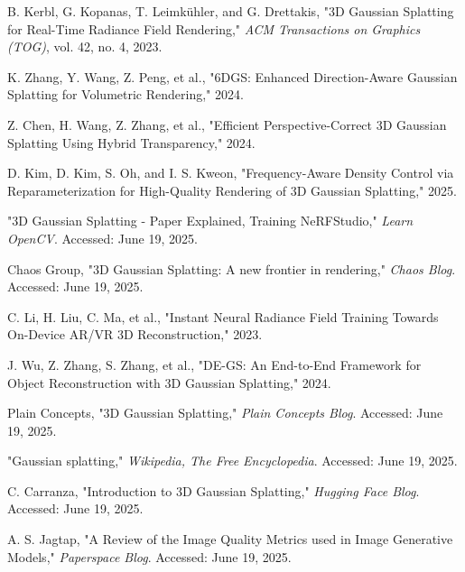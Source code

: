 \documentclass[11pt]{article}
\begin{document}
\begin{thebibliography}{99}
B. Kerbl, G. Kopanas, T. Leimkühler, and G. Drettakis, "3D Gaussian Splatting for Real-Time Radiance Field Rendering," \textit{ACM Transactions on Graphics (TOG)}, vol. 42, no. 4, 2023.

K. Zhang, Y. Wang, Z. Peng, et al., "6DGS: Enhanced Direction-Aware Gaussian Splatting for Volumetric Rendering," 2024.

Z. Chen, H. Wang, Z. Zhang, et al., "Efficient Perspective-Correct 3D Gaussian Splatting Using Hybrid Transparency," 2024.

D. Kim, D. Kim, S. Oh, and I. S. Kweon, "Frequency-Aware Density Control via Reparameterization for High-Quality Rendering of 3D Gaussian Splatting," 2025.

"3D Gaussian Splatting - Paper Explained, Training NeRFStudio," \textit{Learn OpenCV}. Accessed: June 19, 2025.

Chaos Group, "3D Gaussian Splatting: A new frontier in rendering," \textit{Chaos Blog}. Accessed: June 19, 2025.

C. Li, H. Liu, C. Ma, et al., "Instant Neural Radiance Field Training Towards On-Device AR/VR 3D Reconstruction," 2023. 

J. Wu, Z. Zhang, S. Zhang, et al., "DE-GS: An End-to-End Framework for Object Reconstruction with 3D Gaussian Splatting," 2024. 

Plain Concepts, "3D Gaussian Splatting," \textit{Plain Concepts Blog}. Accessed: June 19, 2025.

"Gaussian splatting," \textit{Wikipedia, The Free Encyclopedia}. Accessed: June 19, 2025.

C. Carranza, "Introduction to 3D Gaussian Splatting," \textit{Hugging Face Blog}. Accessed: June 19, 2025.

A. S. Jagtap, "A Review of the Image Quality Metrics used in Image Generative Models," \textit{Paperspace Blog}. Accessed: June 19, 2025.

\end{thebibliography}
\end{document}
